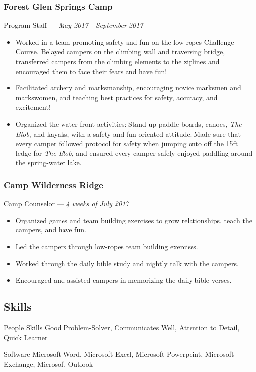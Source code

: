 \documentclass[letterpaper,10pt]{article}
\begin{document}
\subsubsection{Forest Glen Springs Camp}
\hfill Program Staff --- \emph{May 2017 - September 2017}

\begin{itemize}
\tightlist{}
\item
	Worked in a team promoting safety and fun on the low ropes Challenge Course. Belayed campers on the climbing wall and traversing bridge, transferred campers from the climbing elements to the ziplines and encouraged them to face their fears and have fun!
\item
	Facilitated archery and marksmanship, encouraging novice marksmen and markswomen, and teaching best practices for safety, accuracy, and excitement!
\item
	Organized the water front activities: Stand-up paddle boards, canoes, \emph{The Blob}, and kayaks, with a safety and fun oriented attitude. Made sure that every camper followed protocol for safety when jumping onto off the 15ft ledge for \emph{The Blob}, and ensured every camper safely enjoyed paddling around the spring-water lake.
\end{itemize}

\subsubsection{Camp Wilderness Ridge}
\hfill Camp Counselor --- \emph{4 weeks of July 2017}

\begin{itemize}
\tightlist{}
\item
	Organized games and team building exercises to grow relationships, teach the campers, and have fun.
\item
	Led the campers through low-ropes team building exercises.
\item
	Worked through the daily bible study and nightly talk with the campers.
\item
	Encouraged and assisted campers in memorizing the daily bible verses.	
\end{itemize}

\subsection{Skills}

\begin{skills}
\item[People Skills]
  Good Problem-Solver, Communicates Well, Attention to Detail, Quick Learner
\item[Software]
  Microsoft Word, Microsoft Excel, Microsoft Powerpoint, Microsoft Exchange, Microsoft Outlook
\end{skills}
\end{document}

